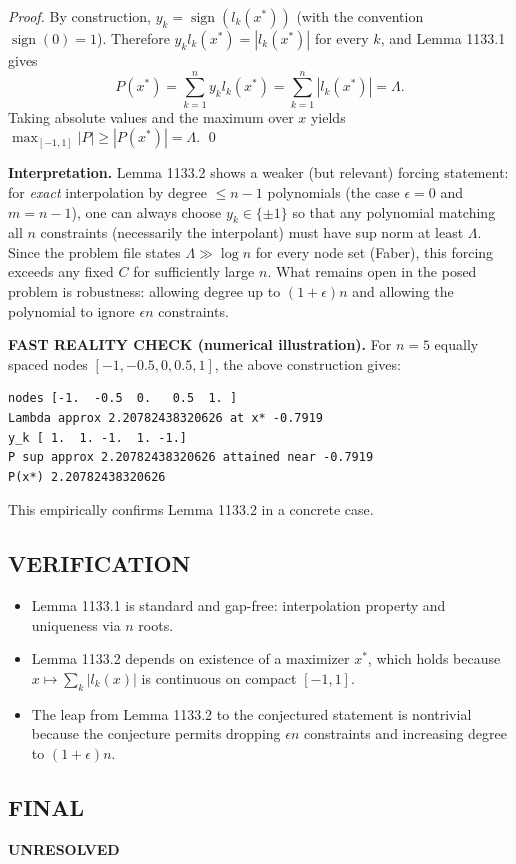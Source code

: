 \emph{Proof.}
By construction, $y_k=\operatorname{sign}(l_k(x^*))$ (with the convention $\operatorname{sign}(0)=1$).
Therefore $y_k l_k(x^*)=|l_k(x^*)|$ for every $k$, and Lemma 1133.1 gives
\[
P(x^*)=\sum_{k=1}^n y_k l_k(x^*)=\sum_{k=1}^n |l_k(x^*)|=\Lambda.
\]
Taking absolute values and the maximum over $x$ yields $\max_{[-1,1]}|P|\ge |P(x^*)|=\Lambda$.
\qed

\textbf{Interpretation.}
Lemma 1133.2 shows a weaker (but relevant) forcing statement: for \emph{exact} interpolation by degree $\le n-1$ polynomials (the case $\epsilon=0$ and $m=n-1$), one can always choose $y_k\in\{\pm 1\}$ so that any polynomial matching all $n$ constraints (necessarily the interpolant) must have sup norm at least $\Lambda$.
Since the problem file states $\Lambda\gg\log n$ for every node set (Faber), this forcing exceeds any fixed $C$ for sufficiently large $n$.
What remains open in the posed problem is robustness: allowing degree up to $(1+\epsilon)n$ and allowing the polynomial to ignore $\epsilon n$ constraints.

\textbf{FAST REALITY CHECK (numerical illustration).}
For $n=5$ equally spaced nodes $[-1,-0.5,0,0.5,1]$, the above construction gives:
\begin{verbatim}
nodes [-1.  -0.5  0.   0.5  1. ]
Lambda approx 2.20782438320626 at x* -0.7919
y_k [ 1.  1. -1.  1. -1.]
P sup approx 2.20782438320626 attained near -0.7919
P(x*) 2.20782438320626
\end{verbatim}
This empirically confirms Lemma 1133.2 in a concrete case.

\subsection*{VERIFICATION}
\begin{itemize}
\item Lemma 1133.1 is standard and gap-free: interpolation property and uniqueness via $n$ roots.
\item Lemma 1133.2 depends on existence of a maximizer $x^*$, which holds because $x\mapsto \sum_k|l_k(x)|$ is continuous on compact $[-1,1]$.
\item The leap from Lemma 1133.2 to the conjectured statement is nontrivial because the conjecture permits dropping $\epsilon n$ constraints and increasing degree to $(1+\epsilon)n$.
\end{itemize}

\subsection*{FINAL}
\textbf{UNRESOLVED}

